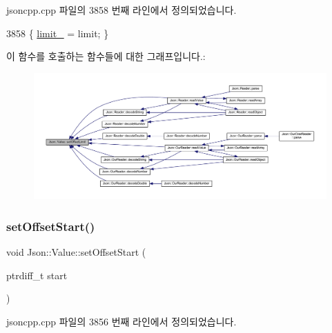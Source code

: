 jsoncpp.\+cpp 파일의 3858 번째 라인에서 정의되었습니다.


\begin{DoxyCode}
3858 \{ \hyperlink{class_json_1_1_value_afe377e25f6d3b5b8ea7221c84f29412a}{limit\_} = limit; \}
\end{DoxyCode}
이 함수를 호출하는 함수들에 대한 그래프입니다.\+:\nopagebreak
\begin{figure}[H]
\begin{center}
\leavevmode
\includegraphics[width=350pt]{class_json_1_1_value_a5e4f5853fec138150c5df6004a8c2bcf_icgraph}
\end{center}
\end{figure}
\mbox{\label{class_json_1_1_value_a92e32ea0f4f8a15853a3cf0beac9feb9}} 
\subsubsection{\texorpdfstring{set\+Offset\+Start()}{setOffsetStart()}}
{\footnotesize\ttfamily void Json\+::\+Value\+::set\+Offset\+Start (\begin{DoxyParamCaption}\item[{ptrdiff\+\_\+t}]{start }\end{DoxyParamCaption})}



jsoncpp.\+cpp 파일의 3856 번째 라인에서 정의되었습니다.


